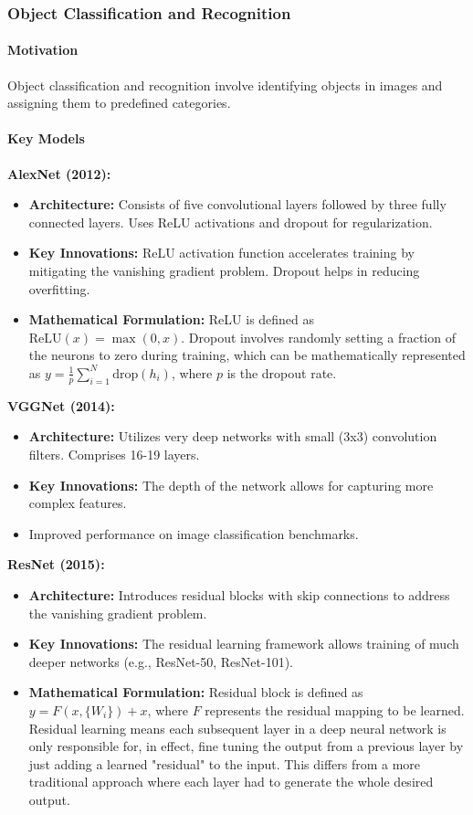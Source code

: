 \documentclass[12pt]{article}
\begin{document}
\subsubsection{Object Classification and Recognition}

\paragraph{Motivation}
Object classification and recognition involve identifying objects in images and assigning them to predefined categories.

\paragraph{Key Models}

\textbf{AlexNet (2012):}
\begin{itemize}
    \item \textbf{Architecture:} Consists of five convolutional layers followed by three fully connected layers. Uses ReLU activations and dropout for regularization.
    \item \textbf{Key Innovations:} ReLU activation function accelerates training by mitigating the vanishing gradient problem. Dropout helps in reducing overfitting.
    \item \textbf{Mathematical Formulation:} ReLU is defined as \( \text{ReLU}(x) = \max(0, x) \). Dropout involves randomly setting a fraction of the neurons to zero during training, which can be mathematically represented as \( y = \frac{1}{p} \sum_{i=1}^{N} \text{drop}(h_i) \), where \( p \) is the dropout rate.
\end{itemize}

\textbf{VGGNet (2014):}
\begin{itemize}
    \item \textbf{Architecture:} Utilizes very deep networks with small (3x3) convolution filters. Comprises 16-19 layers.
    \item \textbf{Key Innovations:} The depth of the network allows for capturing more complex features.
    \item Improved performance on image classification benchmarks.
\end{itemize}

\textbf{ResNet (2015):}
\begin{itemize}
    \item \textbf{Architecture:} Introduces residual blocks with skip connections to address the vanishing gradient problem.
    \item \textbf{Key Innovations:} The residual learning framework allows training of much deeper networks (e.g., ResNet-50, ResNet-101).
    \item \textbf{Mathematical Formulation:} Residual block is defined as \( y = F(x, \{W_i\}) + x \), where \( F \) represents the residual mapping to be learned. Residual learning means each subsequent layer in a deep neural network is only responsible for, in effect, fine tuning the output from a previous layer by just adding a learned "residual" to the input. This differs from a more traditional approach where each layer had to generate the whole desired output.
\end{itemize}
\end{document}
